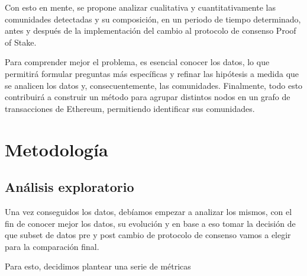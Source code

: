 \documentclass{article}
\begin{document}
Con esto en mente, se propone analizar cualitativa y cuantitativamente las comunidades detectadas y su composición, en un periodo de tiempo determinado, antes y después de la implementación del cambio al protocolo de consenso Proof of Stake.

Para comprender mejor el problema, es esencial conocer los datos, lo que permitirá formular preguntas más específicas y refinar las hipótesis a medida que se analicen los datos y, consecuentemente, las comunidades.
Finalmente, todo esto contribuirá a construir un método para agrupar distintos nodos en un grafo de transacciones de Ethereum, permitiendo identificar sus comunidades.


\section{Metodología}

\subsection{Análisis exploratorio}

Una vez conseguidos los datos, debíamos empezar a analizar los mismos, con el fin de conocer mejor los datos, su evolución y en base a eso tomar la decisión de que subset de datos pre y post cambio de protocolo de consenso vamos a elegir para la comparación final.

Para esto, decidimos plantear una serie de métricas 




%
\end{document}
